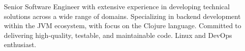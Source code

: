 

\begin{cvparagraph}

Senior Software Engineer with extensive experience in developing technical solutions across a wide range of domains. Specializing in backend development within the JVM ecosystem, with focus on the Clojure language. Committed to delivering high-quality, testable, and maintainable code. Linux and DevOps enthusiast.
\end{cvparagraph}
